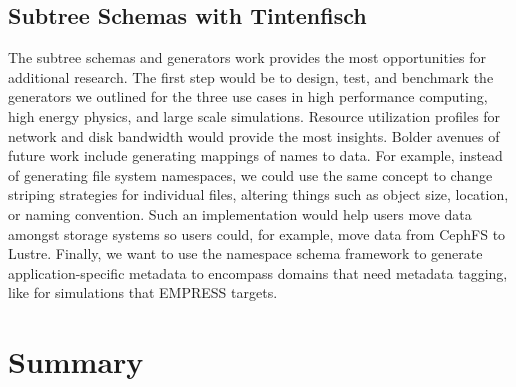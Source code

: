 








\subsection{Subtree Schemas with Tintenfisch}

The subtree schemas and generators work provides the most opportunities for
additional research. The first step would be to design, test, and benchmark
the generators we outlined for the three use cases in high performance
computing, high energy physics, and large scale simulations.  Resource
utilization profiles for network and disk bandwidth would provide the most
insights. Bolder avenues of future work include generating mappings of names to
data. For example, instead of generating file system namespaces, we could use
the same concept to change striping strategies for individual files, altering
things such as object size, location, or naming convention. Such an
implementation would help users move data amongst storage systems so users
could, for example, move data from CephFS to Lustre. Finally, we want to use
the namespace schema framework to generate application-specific metadata to
encompass domains that need metadata tagging, like for simulations that EMPRESS
targets.

\section{Summary}

